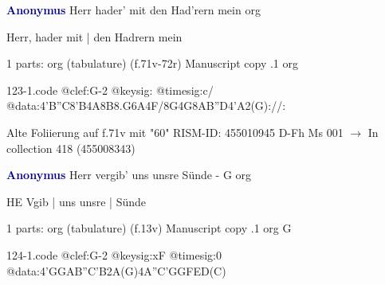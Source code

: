 \documentclass[twocolumn]{book}
\begin{document}
\newline \par \vspace{7pt} \textcolor{darkblue}{\textbf{Anonymus  }}
\newline Herr hader' mit den Had'rern mein
\newline org
\newline \begin{itshape}[f.71v, at left:] Herr, hader mit | den Hadrern mein\end{itshape} 
\newline \textcolor{darkblue}{}  1 parts: org (tabulature)  (f.71v-72r)
\newline Manuscript copy
.1  org  
\begin{filecontents*}{123-1.code}
@clef:G-2
@keysig:
@timesig:c/
@data:4'B''C8'B4A8B8.G6A4F/8G4G8A{B''D}4'A2(G)://:
\end{filecontents*}
\newline
%

\newline Alte Foliierung auf f.71v mit "60"
\newline RISM-ID: 455010945
\newline D-Fh  Ms 001
\newline $\rightarrow$ In collection 418 (455008343)
      
\newline \par \vspace{7pt} \textcolor{darkblue}{\textbf{Anonymus  }}
\newline Herr vergib' uns unsre Sünde - G
\newline org
\newline \begin{itshape}[f.13v, at left:] HE Vgib | uns unsre | Sünde\end{itshape} 
\newline \textcolor{darkblue}{}  1 parts: org (tabulature)  (f.13v)
\newline Manuscript copy
.1  org  G  
\begin{filecontents*}{124-1.code}
@clef:G-2
@keysig:xF
@timesig:0
@data:4'GGAB''C'B2A(G)4A''C'GGFED(C)
\end{filecontents*}
\newline
%
\end{document}
